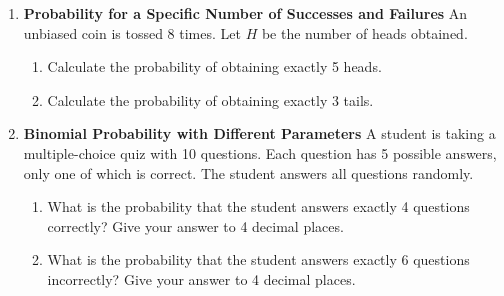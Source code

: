 \documentclass[12pt]{article}
\begin{document}
\begin{enumerate}
    \item \textbf{Probability for a Specific Number of Successes and Failures}
    An unbiased coin is tossed 8 times. Let $H$ be the number of heads obtained.
    \begin{enumerate}
        \item Calculate the probability of obtaining exactly 5 heads.
        \item Calculate the probability of obtaining exactly 3 tails.
    \end{enumerate}

    \item \textbf{Binomial Probability with Different Parameters}
    A student is taking a multiple-choice quiz with 10 questions. Each question has 5 possible answers, only one of which is correct. The student answers all questions randomly.
    \begin{enumerate}
        \item What is the probability that the student answers exactly 4 questions correctly? Give your answer to 4 decimal places.
        \item What is the probability that the student answers exactly 6 questions incorrectly? Give your answer to 4 decimal places.
    \end{enumerate}
\end{enumerate}
\end{document}
